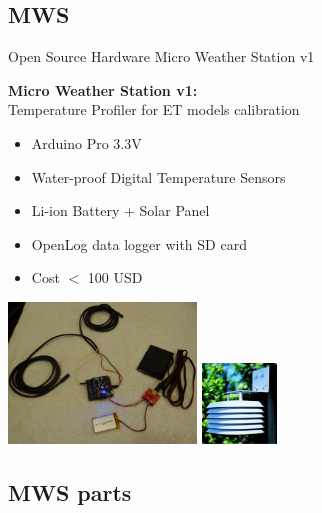\documentclass[aspectratio=169,unknownkeysallowed,xcolor=dvipsnames,beamer]{beamer} %
\begin{document}
\subsection{MWS}
\begin{frame}[fragile]{Open Source Hardware Micro Weather Station v1}

\textbf{Micro Weather Station v1:}\\
Temperature Profiler for ET models calibration
\vspace{5mm}
\begin{itemize}
 \item Arduino Pro 3.3V
 \item Water-proof Digital Temperature Sensors
 \item Li-ion Battery + Solar Panel
 \item OpenLog data logger with SD card
 \item Cost $<$ 100 USD
\end{itemize}
\begin{flushright}
  \includegraphics[width=5cm]{MWS}
  \hspace{5mm}
  \includegraphics[width=2cm]{MWS_radshield}
\end{flushright}
\end{frame}

\subsection{MWS parts}
{
\begin{frame}[plain]
\end{frame}}
\end{document}
